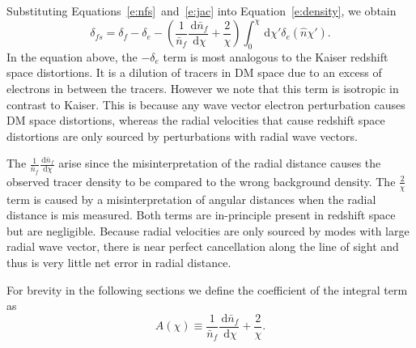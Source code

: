 \documentclass[twocolumn,prl,nofootinbib]{revtex4-1}
\makeatletter
\newcommand{\ud}{\,\mathrm{d}}
\def\ignorespacesandimplicitepars{%
  \begingroup
  \catcode13=10
  \@ifnextchar\relax
    {\endgroup}%
    {\endgroup}%
}
\renewcommand{\section}[1]{\emph{#1}---\ignorespacesandimplicitepars}
\makeatother
\begin{document}
Substituting Equations~\ref{e:nfs}~and~\ref{e:jac} into Equation~\ref{e:density},
we obtain
\begin{equation}
\label{e:delta_s}
    \delta_{fs} = \delta_f - \delta_e
    - \left(\frac{1}{\bar{n}_f}\frac{\ud \bar{n}_f}{\ud \chi}
    + \frac{2}{\chi} \right)
        \int_0^\chi \ud \chi' \delta_e(\hat n \chi').
\end{equation}
In the equation above, the $-\delta_e$ term is most analogous to the Kaiser
redshift space distortions.  It is a dilution of tracers in DM space due to an
excess of electrons in between the tracers. However we note that this term is isotropic
in contrast to Kaiser.  This is because any wave vector electron perturbation
causes DM space distortions, whereas the radial velocities that cause
redshift space distortions are only sourced by perturbations with radial wave
vectors.

The $\frac{1}{\bar{n}_f}\frac{\ud \bar{n}_f}{\ud \chi}$ arise since the
misinterpretation of the radial distance causes the observed tracer density to
be compared to the wrong background density. The $\frac{2}{\chi}$ term is
caused by a misinterpretation of angular distances when the radial distance is
mis measured.  Both terms are in-principle present in redshift space but are
negligible. Because radial velocities are only sourced by modes with large
radial wave vector, there is near perfect cancellation along the line of sight
and thus is very little net error in radial distance.

For brevity in the following sections we define the coefficient of the integral
term as
\begin{equation}
    A(\chi) \equiv \frac{1}{\bar{n}_f}\frac{\ud \bar{n}_f}{\ud \chi}
    + \frac{2}{\chi}.
\end{equation}


\end{document}
